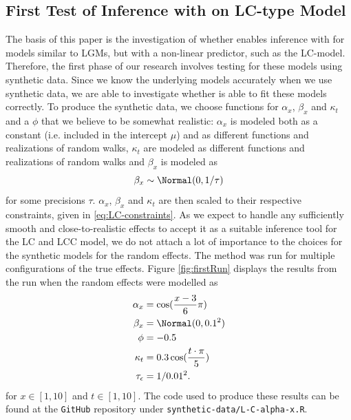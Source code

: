\subsection{First Test of Inference with \inlabru on LC-type Model}
The basis of this paper is the investigation of whether \inlabru enables inference with \inla for models similar to LGMs, but with a non-linear predictor, such as the LC-model. Therefore, the first phase of our research involves testing \inlabru for these models using synthetic data. Since we know the underlying models accurately when we use synthetic data, we are able to investigate whether \inlabru is able to fit these models correctly. 
\newline
\noindent To produce the synthetic data, we choose functions for $\alpha_x$, $\beta_x$ and $\kappa_t$ and a $\phi$ that we believe to be somewhat realistic: $\alpha_x$ is modeled both as a constant (i.e. included in the intercept $\mu$) and as different functions and realizations of random walks, $\kappa_t$ are modeled as different functions and realizations of random walks and $\beta_x$ is modeled as 
\begin{equation*}
    \beta_x \sim \Normal(0,1/\tau)
\end{equation*} 
for some precisions $\tau$. $\alpha_x$, $\beta_x$ and $\kappa_t$ are then scaled to their respective constraints, given in \ref{eq:LC-constraints}. As we expect \inlabru to handle any sufficiently smooth and close-to-realistic effects to accept it as a suitable inference tool for the LC and LCC model, we do not attach a lot of importance to the choices for the synthetic models for the random effects. 
The \inlabru method was run for multiple configurations of the true effects. Figure \ref{fig:firstRun} displays the results from the run when the random effects were modelled as
\begin{equation}
    \begin{aligned}
    \alpha_x &= \cos(\frac{x-3}{6}\pi)\\
    \beta_x &= \Normal(0,0.1^2)\\
    \phi &= -0.5\\
    \kappa_t &= 0.3\cos(\frac{t\cdot \pi}{5})\\
    \tau_{\epsilon} &= 1/0.01^2.
    \end{aligned}
    \label{eq:conf21}
\end{equation}
for $x\in [1,10]$ and $t \in [1,10]$. The code used to produce these results can be found at the \texttt{GitHub} repository under \texttt{synthetic-data/L-C-alpha-x.R}. 
